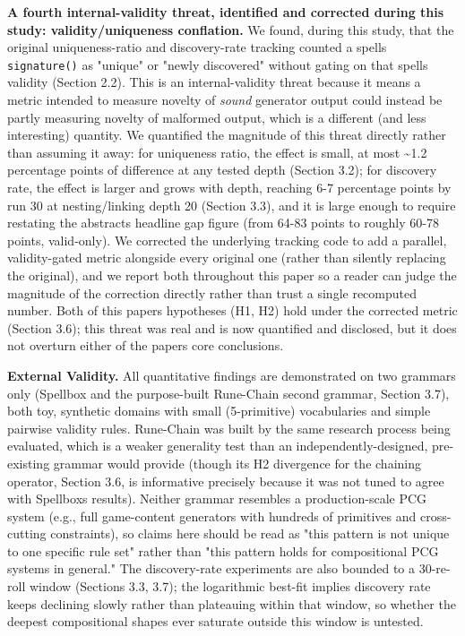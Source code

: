 \documentclass[
  10pt,
  twocolumn]{article}
\begin{document}
\textbf{A fourth internal-validity threat, identified and corrected
during this study: validity/uniqueness conflation.} We found, during
this study, that the original uniqueness-ratio and discovery-rate
tracking counted a spell\textquotesingle s \texttt{signature()} as
"unique" or "newly discovered" without gating on that
spell\textquotesingle s validity (Section 2.2). This is an
internal-validity threat because it means a metric intended to measure
novelty of \emph{sound} generator output could instead be partly
measuring novelty of malformed output, which is a different (and less
interesting) quantity. We quantified the magnitude of this threat
directly rather than assuming it away: for uniqueness ratio, the effect
is small, at most \textasciitilde1.2 percentage points of difference at
any tested depth (Section 3.2); for discovery rate, the effect is larger
and grows with depth, reaching 6-7 percentage points by run 30 at
nesting/linking depth 20 (Section 3.3), and it is large enough to
require restating the abstract\textquotesingle s headline gap figure
(from 64-83 points to roughly 60-78 points, valid-only). We corrected
the underlying tracking code to add a parallel, validity-gated metric
alongside every original one (rather than silently replacing the
original), and we report both throughout this paper so a reader can
judge the magnitude of the correction directly rather than trust a
single recomputed number. Both of this paper\textquotesingle s
hypotheses (H1, H2) hold under the corrected metric (Section 3.6); this
threat was real and is now quantified and disclosed, but it does not
overturn either of the paper\textquotesingle s core conclusions.

\textbf{External Validity.} All quantitative findings are demonstrated
on two grammars only (Spellbox and the purpose-built Rune-Chain second
grammar, Section 3.7), both toy, synthetic domains with small
(5-primitive) vocabularies and simple pairwise validity rules.
Rune-Chain was built by the same research process being evaluated, which
is a weaker generality test than an independently-designed, pre-existing
grammar would provide (though its H2 divergence for the chaining
operator, Section 3.6, is informative precisely because it was not tuned
to agree with Spellbox\textquotesingle s results). Neither grammar
resembles a production-scale PCG system (e.g., full game-content
generators with hundreds of primitives and cross-cutting constraints),
so claims here should be read as "this pattern is not unique to one
specific rule set" rather than "this pattern holds for compositional PCG
systems in general." The discovery-rate experiments are also bounded to
a 30-re-roll window (Sections 3.3, 3.7); the logarithmic best-fit
implies discovery rate keeps declining slowly rather than plateauing
within that window, so whether the deepest compositional shapes ever
saturate outside this window is untested.
\end{document}
